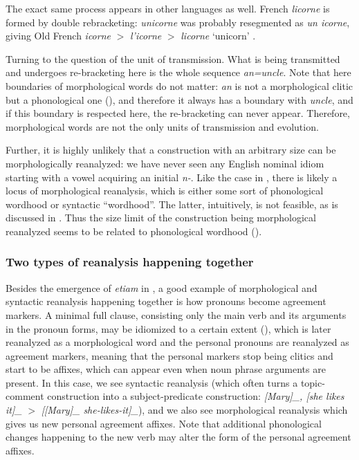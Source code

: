 \documentclass[a4paper, oneside, scheme=plain, 12pt]{article}
\newcommand*{\citepage}[1]{p.~{#1}}
\newcommand{\form}[1]{\emph{#1}}
\newcommand*{\textgt}{$>$ }
\newcommand{\translate}[1]{`#1'}
\begin{document}
The exact same process appears in other languages as well.
French \form{licorne} is formed by double rebracketing:
\form{unicorne} was probably resegmented as \form{un icorne},
giving Old French \form{icorne} \textgt \form{l'icorne} \textgt \form{licorne} \translate{unicorn}
\citep[\citepage{305}]{alkire2010romance}.

Turning to the question of the unit of transmission.
What is being transmitted and undergoes re-bracketing here is the whole sequence \form{an=uncle}.
Note that here boundaries of morphological words do not matter:
\form{an} is not a morphological clitic but a phonological one (),
and therefore it always has a boundary with \form{uncle},
and if this boundary is respected here, the re-bracketing can never appear.
Therefore, morphological words are not the only units of transmission and evolution.

Further, it is highly unlikely that a construction with an arbitrary size can be morphologically reanalyzed:
we have never seen any English nominal idiom starting with a vowel acquiring an initial \form{n-}.
Like the case in ,
there is likely a locus of morphological reanalysis,
which is either some sort of phonological wordhood or syntactic ``wordhood''.
The latter, intuitively, is not feasible, as is discussed in .
Thus the size limit of the construction being morphological reanalyzed seems to be related to phonological wordhood ().


\subsubsection{Two types of reanalysis happening together}\label{sec:both-types-of-reanalysis}

Besides the emergence of \form{etiam} in ,
a good example of morphological and syntactic reanalysis happening together 
is how pronouns become agreement markers.
A minimal full clause, consisting only the main verb and its arguments in the pronoun forms,
may be idiomized to a certain extent (),
which is later reanalyzed as a morphological word and the personal pronouns are reanalyzed as agreement markers, meaning that the personal markers stop being clitics and start to be affixes,
which can appear even when noun phrase arguments are present.
In this case, we see syntactic reanalysis 
(which often turns a topic-comment construction into a subject-predicate construction:
\form{[Mary]_{}, [she likes it]_{\text{comment:nucleus clause}}} \textgt \form{[[Mary]_{} she-likes-it]_{\text{nucleus clause}}}),
and we also see morphological reanalysis which gives us new personal agreement affixes.
Note that additional phonological changes happening to the new verb may alter the form of the personal agreement affixes.
\end{document}
